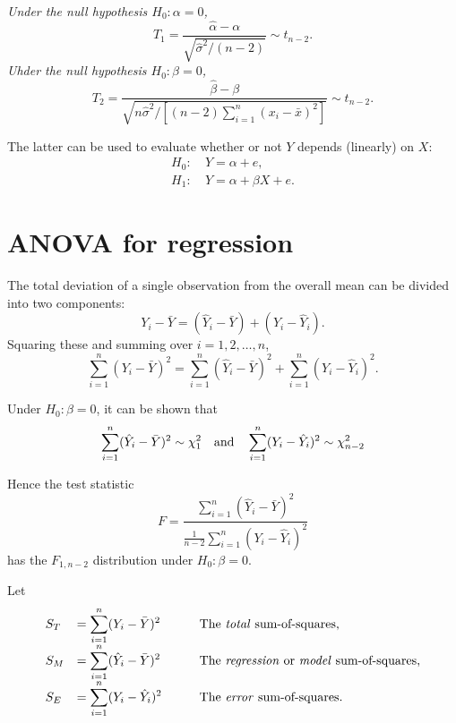 \bit
\it Under the null hypothesis $H_0:\alpha=0$, 
\[
T_1 = \frac{\hat{\alpha}-\alpha}{\sqrt{\hat{\sigma}^2/(n-2)}} \sim t_{n-2}.
\]
\it Uhder the null hypothesis $H_0:\beta=0$,
\[
T_2 = \frac{\hat{\beta}-\beta}{\sqrt{n\hat{\sigma}^2/[(n-2)\sum_{i=1}^n(x_i-\bar{x})^2]}} \sim t_{n-2}.
\]
\eit

\vspace*{2ex}
The latter can be used to evaluate whether or not $Y$ depends (linearly) on $X$:
\begin{align*}
H_0: 	&\ Y = \alpha+e, \\
H_1:	&\ Y = \alpha+\beta X + e.
\end{align*}


\section{ANOVA for regression}
The total deviation of a single observation from the overall mean can be divided into two components:
\[
Y_i - \bar{Y} = (\hat{Y}_i - \bar{Y}) + (Y_i-\hat{Y}_i).
\]
Squaring these and summing over $i=1,2,\ldots,n$,
\[
\sum_{i=1}^n(Y_i - \bar{Y})^2 = \sum_{i=1}^n(\hat{Y}_i - \bar{Y})^2 + \sum_{i=1}^n(Y_i-\hat{Y}_i)^2.
\]

Under $H_0:\beta=0$, it can be shown that 
\[
\sum_{i=1}^n (\hat{Y}_i-\bar{Y})^2	\sim \chi^2_1
\text{\quad and\quad}
\sum_{i=1}^n (Y_i-\hat{Y}_i)^2		\sim \chi^2_{n-2}
\]
%

Hence the test statistic
\[
F = \frac{\sum_{i=1}^n (\hat{Y}_i-\bar{Y})^2}{\frac{1}{n-2}\sum_{i=1}^n (Y_i-\hat{Y}_i)^2} 
\]
has the $F_{1,n-2}$ distribution under $H_0:\beta=0$.



Let
\[
\begin{array}{lll}
S_T	& = \displaystyle\sum_{i=1}^n (Y_i-\bar{Y})^2
\qquad & \text{The \emph{total} sum-of-squares,} \\
S_M	& = \displaystyle\sum_{i=1}^n (\hat{Y}_i-\bar{Y})^2
\qquad & \text{The \emph{regression} or \emph{model} sum-of-squares,} \\
S_E	& = \displaystyle\sum_{i=1}^n (Y_i-\hat{Y}_i)^2
\qquad & \text{The \emph{error} sum-of-squares.} 
\end{array}
\]


